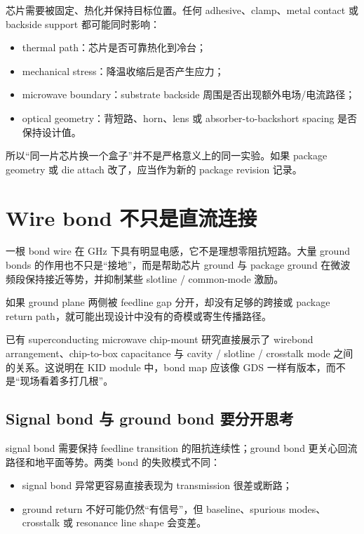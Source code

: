 芯片需要被固定、热化并保持目标位置。任何 adhesive、clamp、metal contact 或 backside support 都可能同时影响：

\begin{itemize}
  \item thermal path：芯片是否可靠热化到冷台；
  \item mechanical stress：降温收缩后是否产生应力；
  \item microwave boundary：substrate backside 周围是否出现额外电场/电流路径；
  \item optical geometry：背短路、horn、lens 或 absorber-to-backshort spacing 是否保持设计值。
\end{itemize}

所以“同一片芯片换一个盒子”并不是严格意义上的同一实验。如果 package geometry 或 die attach 改了，应当作为新的 package revision 记录。

\section{Wire bond 不只是直流连接}

一根 bond wire 在 GHz 下具有明显电感，它不是理想零阻抗短路。大量 ground bonds 的作用也不只是“接地”，而是帮助芯片 ground 与 package ground 在微波频段保持接近等势，并抑制某些 slotline / common-mode 激励。

如果 ground plane 两侧被 feedline gap 分开，却没有足够的跨接或 package return path，就可能出现设计中没有的奇模或寄生传播路径。

已有 superconducting microwave chip-mount 研究直接展示了 wirebond arrangement、chip-to-box capacitance 与 cavity / slotline / crosstalk mode 之间的关系。这说明在 KID module 中，bond map 应该像 GDS 一样有版本，而不是“现场看着多打几根”。

\subsection{Signal bond 与 ground bond 要分开思考}

signal bond 需要保持 feedline transition 的阻抗连续性；ground bond 更关心回流路径和地平面等势。两类 bond 的失败模式不同：

\begin{itemize}
  \item signal bond 异常更容易直接表现为 transmission 很差或断路；
  \item ground return 不好可能仍然“有信号”，但 baseline、spurious modes、crosstalk 或 resonance line shape 会变差。
\end{itemize}

